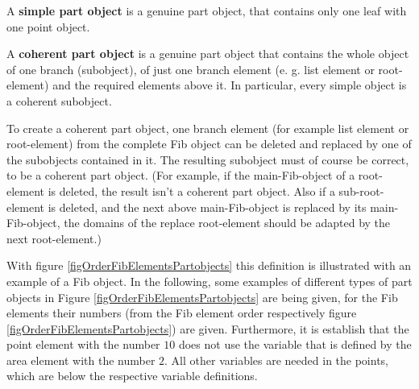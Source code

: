 A \textbf{simple part object} is a genuine part object, that contains only one leaf with one point object.

A \textbf{coherent part object} is a genuine part object that contains the whole object of one branch (subobject), of just one branch element (e. g. list element or root-element) and the required elements above it. In particular, every simple object is a coherent subobject.

To create a coherent part object, one branch element (for example list element or root-element) from the complete Fib object can be deleted and replaced by one of the subobjects contained in it. The resulting subobject must of course be correct, to be a coherent part object. (For example, if the main-Fib-object of a root-element is deleted, the result isn't a coherent part object. Also if a sub-root-element is deleted, and the next above main-Fib-object is replaced by its main-Fib-object, the domains of the replace root-element should be adapted by the next root-element.)

With figure \ref{figOrderFibElementsPartobjects} this definition is illustrated with an example of a Fib object. In the following, some examples of different types of part objects in Figure \ref{figOrderFibElementsPartobjects} are being given, for the Fib elements their numbers (from the Fib element order respectively figure \ref{figOrderFibElementsPartobjects}) are given. Furthermore, it is establish that the point element with the number $10$ does not use the variable that is defined by the area element with the number $2$. All other variables are needed in the points, which are below the respective variable definitions.


